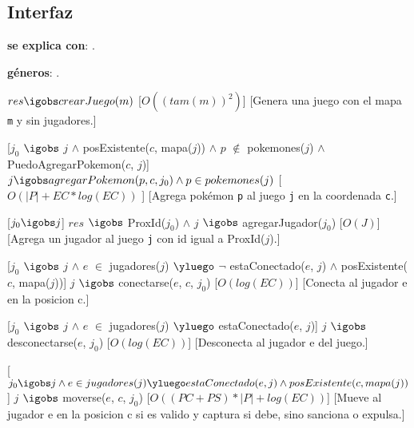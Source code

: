 \begin{Interfaz}
\subsection{Interfaz}

\textbf{se explica con}: .

\textbf{g\'eneros}: .






%
{$res \igobs crearJuego(m)$}%
[$O((tam(m))^2)$]
[Genera una juego con el mapa \texttt{m} y sin jugadores.]


[$j_0$ $\igobs$ $j$ $\land$ posExistente($c$, mapa($j$)) $\land$ $p$ $\not \in$ pokemones($j$) $\land$ PuedoAgregarPokemon($c$, $j$)]  
{$j \igobs agregarPokemon(p, c, j_0)  \land p \in pokemones(j)$}
[$O(|P| + EC*log(EC))$ ]
[Agrega pok\'emon \texttt{p} al juego \texttt{j} en la coordenada \texttt{c}.]


[$ j_0 \igobs j $]
{$res$ $\igobs$ ProxId($j_0$) $\land$ $j$ $\igobs$ agregarJugador($j_0$)}%
[$O(J)$]
[Agrega un jugador al juego \texttt{j} con id igual a ProxId($j$).]


%
[$j_0$ $\igobs$ $j$ $\land$ $e$ $\in$ jugadores($j$) $\yluego$ $\neg$ estaConectado($e$, $j$) $\land $ posExistente($c$, mapa($j$))]
{$j$ $\igobs$ conectarse($e$, $c$, $j_0$)}%
[$O(log(EC))$] %
[Conecta al jugador e en la posicion c.]


%
[$j_0$ $\igobs$ $j$ $\land$ $e$ $\in$ jugadores($j$) $\yluego$ estaConectado($e$, $j$)]
{$j$ $\igobs$ desconectarse($e$, $j_0$)}%
[$O(log(EC))$] %
[Desconecta al jugador e del juego.]


%
[$j_0 \igobs j \land e \in jugadores(j) \yluego estaConectado(e, j) \land posExistente(c, mapa(j)) $]
{$j$ $\igobs$ moverse($e$, $c$, $j_0$)}%
[$O((PC + PS) * |P| + log(EC))$] %
[Mueve al jugador e en la posicion c si es valido y captura si debe, sino sanciona o expulsa.]


\end{Interfaz}
